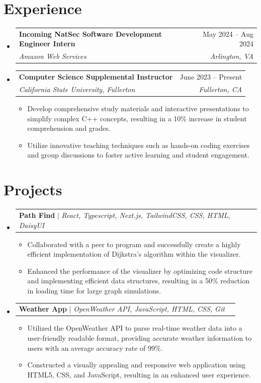 \documentclass[letterpaper,11pt]{article}
\makeatletter
\newcommand{\resumeItem}[1]{
  \item\small{
    {#1 \vspace{-2pt}}
  }
}
\newcommand{\resumeSubheading}[4]{
  \vspace{-2pt}\item
    \begin{tabular*}{0.97\textwidth}[t]{l@{\extracolsep{\fill}}r}
      \textbf{#1} & #2 \\
      \textit{\small#3} & \textit{\small #4} \\
    \end{tabular*}\vspace{-7pt}
}
\newcommand{\resumeSubSubheading}[2]{
    \item
    \begin{tabular*}{0.97\textwidth}{l@{\extracolsep{\fill}}r}
      \textit{\small#1} & \textit{\small #2} \\
    \end{tabular*}\vspace{-7pt}
}
\newcommand{\resumeProjectHeading}[2]{
    \item
    \begin{tabular*}{0.97\textwidth}{l@{\extracolsep{\fill}}r}
      \small#1 & #2 \\
    \end{tabular*}\vspace{-7pt}
}
\newcommand{\resumeSubHeadingListStart}{\begin{itemize}[leftmargin=0.15in, label={}]}
\newcommand{\resumeSubHeadingListEnd}{\end{itemize}}
\newcommand{\resumeItemListStart}{\begin{itemize}}
\newcommand{\resumeItemListEnd}{\end{itemize}\vspace{-5pt}}
\makeatother
\begin{document}
  \section{Experience}
  \resumeSubHeadingListStart
  \resumeSubheading
  {Incoming NatSec Software Development Engineer Intern}{May 2024 -- Aug 2024}
  {Amazon Web Services}{Arlington, VA}

  \resumeSubheading
  {Computer Science Supplemental Instructor}{June 2023 -- Present}
  {California State University, Fullerton}{Fullerton, CA}
  \resumeItemListStart
  \resumeItem{Develop comprehensive study materials and interactive presentations to simplify complex C++ concepts, resulting in a 10\% increase in student comprehension and grades.}
  \resumeItem{Utilize innovative teaching techniques such as hands-on coding exercises and group discussions to foster active learning and student engagement.}
  \resumeItemListEnd
  \resumeSubHeadingListEnd
  \section{Projects}
  \resumeSubHeadingListStart
  \resumeProjectHeading
  {\textbf{Path Find} $|$ \emph{React, Typescript, Next.js, TailwindCSS, CSS, HTML, DaisyUI}}{}
  \resumeItemListStart
  \resumeItem{Collaborated with a peer to program and successfully create a highly efficient implementation of Dijkstra's algorithm within the visualizer.}
  \resumeItem{Enhanced the performance of the visualizer by optimizing code structure and implementing efficient data structures, resulting in a 50\% reduction in loading time for large graph simulations.}
  \resumeItemListEnd
  \resumeProjectHeading
  {\textbf{Weather App} $|$ \emph{OpenWeather API, JavaScript, HTML, CSS, Git}}{}
  \resumeItemListStart
  \resumeItem{Utilized the OpenWeather API to parse real-time weather data into a user-friendly readable format, providing accurate weather information to users with an average accuracy rate of 99\%.}
  \resumeItem{Constructed a visually appealing and responsive web application using HTML5, CSS, and JavaScript, resulting in an enhanced user experience.}
  \resumeItemListEnd
  \resumeSubHeadingListEnd
  
\end{document}
